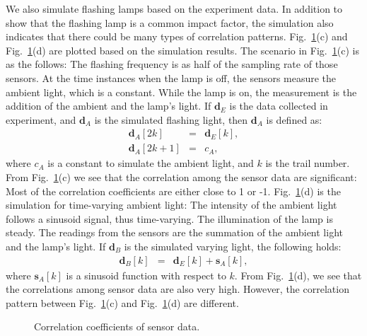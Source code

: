 We also simulate flashing lamps based on the experiment data. In addition to show that the flashing lamp is a common impact factor, the simulation also indicates that there could be many types of correlation patterns.
  Fig.~\ref{f:corcoef}(c) and Fig.~\ref{f:corcoef}(d) are plotted based on the simulation results. The scenario in Fig.~\ref{f:corcoef}(c) is as the follows: The flashing frequency is as half of the sampling rate of those sensors. At the time instances when the lamp is off, the sensors measure the ambient light, which is a constant. While the lamp is on, the measurement is the addition of the ambient and the lamp's light.
  If $\mathbf{d}_E$ is the data collected in experiment, and $\mathbf{d}_A$ is the simulated flashing light, then $\mathbf{d}_A$ is defined as:
\begin{eqnarray*}
  \mathbf{d}_A[2k] &=& \mathbf{d}_E[k], \\
  \mathbf{d}_A[2k+1] &=& c_A, \label{e:ca}
\end{eqnarray*}
where $c_A$ is a constant to simulate the ambient light, and $k$ is the trail number.
From Fig.~\ref{f:corcoef}(c) we see that the correlation among the sensor data are significant: Most of the correlation coefficients are either close to 1 or -1.
    Fig.~\ref{f:corcoef}(d) is the simulation for time-varying ambient light: The intensity of the ambient light follows a sinusoid signal, thus time-varying. The illumination of the lamp is steady. The readings from the sensors are the summation of the ambient light and the lamp's light.
If $\mathbf{d}_B$ is the simulated varying light, the following holds:
    \begin{eqnarray*}
      \mathbf{d}_B[k] &=& \mathbf{d}_E[k]+\mathbf{s}_A[k], \label{e:sA}
    \end{eqnarray*}
    where $\mathbf{s}_A[k]$ is a sinusoid function with respect to $k$.
    From Fig.~\ref{f:corcoef}(d), we see that the correlations among sensor data are also very high. However, the correlation pattern between Fig.~\ref{f:corcoef}(c) and Fig.~\ref{f:corcoef}(d) are different.


\begin{figure}
  \centering
  \caption{Correlation coefficients of sensor data.}\label{f:corcoef}
\end{figure}

